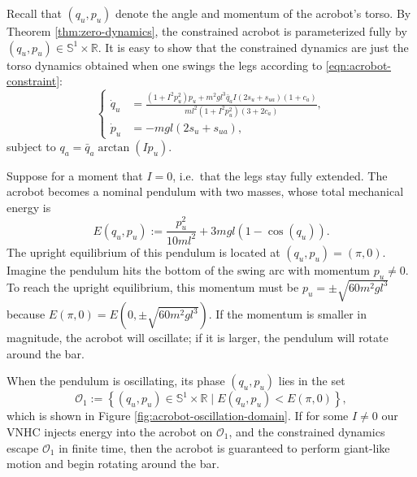 \documentclass[journal,twoside,web]{ieeecolor}
\newcommand*{\R}{\mathbb{R}}
\newcommand*{\Sone}{\mathbb{S}^1}
\newcommand*{\SxR}{\Sone \times \R}
\begin{document}
Recall that \((q_u, p_u)\) denote the angle and momentum of the acrobot's torso.
By Theorem \ref{thm:zero-dynamics}, the constrained acrobot is parameterized
fully by \((q_u,p_u) \in \SxR\).
It is easy to show that the constrained dynamics are
just the torso dynamics obtained when one swings the legs
according to \eqref{eqn:acrobot-constraint}:
\begin{equation}\label{eqn:acrobot-constrained-dynamics}
    \begin{cases}
    \dot{q}_u &= \frac{(1+I^2 p_u^2)p_u + m^2gl^3\bar{q}_a I(2s_u + s_{ua})(1+c_a) }
            {ml^2(1+I^2 p_u^2)(3+2c_a)}
    ,    \\
    \dot{p}_u &= - m g l (2s_u + s_{ua})
    ,
    \end{cases}
\end{equation}
subject to \(q_a = \bar{q}_a \arctan(I p_u)\).

Suppose for a moment that \(I = 0\), i.e.~that the legs stay fully extended.
The acrobot becomes a nominal pendulum with two masses, whose total mechanical
energy is
\begin{equation}\label{eqn:acrobot-energy}
    E(q_u,p_u) := \frac{p_u^2}{10ml^2} + 3mgl(1 - \cos(q_u))
    .
\end{equation}
The upright equilibrium of this pendulum is located at \((q_u,p_u) = (\pi,0)\).
Imagine the pendulum hits the bottom of the swing arc with momentum 
\(p_u \neq 0\). 
To reach the upright equilibrium, this momentum must be
\(p_u = \pm\sqrt{60m^2gl^3}\) because \(E(\pi,0) = E(0,\pm\sqrt{60m^2gl^3})\).
If the momentum is smaller in magnitude, the acrobot will oscillate; 
if it is larger, the pendulum will rotate around the bar.

When the pendulum is oscillating, its phase \((q_u,p_u)\) lies in the set
\begin{equation}\label{eqn:oscillation-domain}
    \mathcal{O}_1 := \left\{(q_u,p_u) \in \SxR 
    \mid E(q_u,p_u) < E(\pi,0) \right\}
    ,
\end{equation}
which is shown in Figure \ref{fig:acrobot-oscillation-domain}.
If for some \(I \neq 0\) our VNHC injects energy into the acrobot on 
\(\mathcal{O}_1\), and the constrained dynamics escape
\(\mathcal{O}_1\) in finite time, then the acrobot is guaranteed to perform
giant-like motion and begin rotating around the bar.
\end{document}
